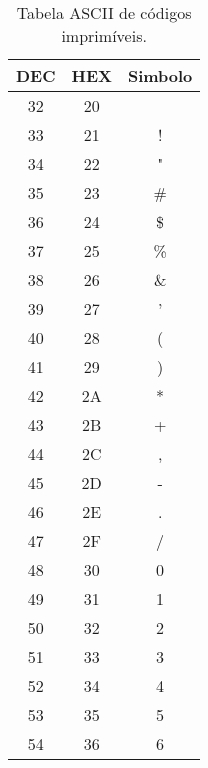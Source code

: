 {\begin{longtable}[c]{c c c l}
  \end{longtable}

  \begin{table}[H]
    \caption{Tabela ASCII de códigos imprimíveis.}
    \label{tab:tabela-ascii-print}
    \centering
    
    \begin{minipage}[t]{.32\textwidth}
      \begin{tabular}{ccc}
        \hline\hline\textbf{DEC} & \textbf{HEX} & \textbf{Simbolo} \\\hline\hline
        32  & 20 & \textvisiblespace{} \\ \hline
        33  & 21 & !                   \\ \hline
        34  & 22 & "                   \\ \hline
        35  & 23 & \#                  \\ \hline
        36  & 24 & \$                  \\ \hline
        37  & 25 & \%                  \\ \hline
        38  & 26 & \&                  \\ \hline
        39  & 27 & '                   \\ \hline
        40  & 28 & (                   \\ \hline
        41  & 29 & )                   \\ \hline
        42  & 2A & *                   \\ \hline
        43  & 2B & +                   \\ \hline
        44  & 2C & ,                   \\ \hline
        45  & 2D & -                   \\ \hline
        46  & 2E & .                   \\ \hline
        47  & 2F & /                   \\ \hline
        48  & 30 & 0                   \\ \hline
        49  & 31 & 1                   \\ \hline
        50  & 32 & 2                   \\ \hline
        51  & 33 & 3                   \\ \hline
        52  & 34 & 4                   \\ \hline
        53  & 35 & 5                   \\ \hline
        54  & 36 & 6                   \\ \hline

\end{tabular}
\end{minipage}
\end{table}}
